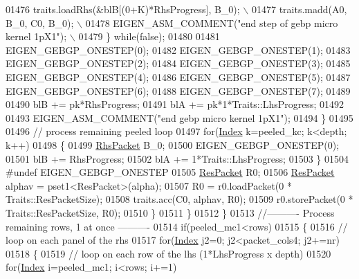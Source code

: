 \begin{DoxyCode}
01476 \textcolor{preprocessor}{              traits.loadRhs(&blB[(0+K)*RhsProgress], B\_0);                     \(\backslash\)}
01477 \textcolor{preprocessor}{              traits.madd(A0, B\_0, C0, B\_0);                                    \(\backslash\)}
01478 \textcolor{preprocessor}{              EIGEN\_ASM\_COMMENT("end step of gebp micro kernel 1pX1");          \(\backslash\)}
01479 \textcolor{preprocessor}{            \} while(false);}
01480 
01481             EIGEN\_GEBGP\_ONESTEP(0);
01482             EIGEN\_GEBGP\_ONESTEP(1);
01483             EIGEN\_GEBGP\_ONESTEP(2);
01484             EIGEN\_GEBGP\_ONESTEP(3);
01485             EIGEN\_GEBGP\_ONESTEP(4);
01486             EIGEN\_GEBGP\_ONESTEP(5);
01487             EIGEN\_GEBGP\_ONESTEP(6);
01488             EIGEN\_GEBGP\_ONESTEP(7);
01489 
01490             blB += pk*RhsProgress;
01491             blA += pk*1*Traits::LhsProgress;
01492 
01493             EIGEN\_ASM\_COMMENT(\textcolor{stringliteral}{"end gebp micro kernel 1pX1"});
01494           \}
01495 
01496           \textcolor{comment}{// process remaining peeled loop}
01497           \textcolor{keywordflow}{for}(\hyperlink{namespace_eigen_a62e77e0933482dafde8fe197d9a2cfde}{Index} k=peeled\_kc; k<depth; k++)
01498           \{
01499             \hyperlink{class_eigen_1_1internal_1_1_tensor_lazy_evaluator_writable}{RhsPacket} B\_0;
01500             EIGEN\_GEBGP\_ONESTEP(0);
01501             blB += RhsProgress;
01502             blA += 1*Traits::LhsProgress;
01503           \}
01504 \textcolor{preprocessor}{#undef EIGEN\_GEBGP\_ONESTEP}
01505           \hyperlink{class_eigen_1_1internal_1_1_tensor_lazy_evaluator_writable}{ResPacket} R0;
01506           \hyperlink{class_eigen_1_1internal_1_1_tensor_lazy_evaluator_writable}{ResPacket} alphav = pset1<ResPacket>(alpha);
01507           R0 = r0.loadPacket(0 * Traits::ResPacketSize);
01508           traits.acc(C0, alphav, R0);
01509           r0.storePacket(0 * Traits::ResPacketSize, R0);
01510         \}
01511       \}
01512     \}
01513     \textcolor{comment}{//---------- Process remaining rows, 1 at once ----------}
01514     \textcolor{keywordflow}{if}(peeled\_mc1<rows)
01515     \{
01516       \textcolor{comment}{// loop on each panel of the rhs}
01517       \textcolor{keywordflow}{for}(\hyperlink{namespace_eigen_a62e77e0933482dafde8fe197d9a2cfde}{Index} j2=0; j2<packet\_cols4; j2+=nr)
01518       \{
01519         \textcolor{comment}{// loop on each row of the lhs (1*LhsProgress x depth)}
01520         \textcolor{keywordflow}{for}(\hyperlink{namespace_eigen_a62e77e0933482dafde8fe197d9a2cfde}{Index} i=peeled\_mc1; i<rows; i+=1)

\end{DoxyCode}

